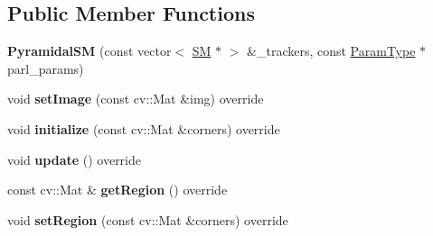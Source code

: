 \subsection*{Public Member Functions}
\begin{DoxyCompactItemize}
\item 
\hypertarget{classPyramidalSM_a79544cbce02e098dd3c0f32f65368e73}{{\bfseries Pyramidal\-S\-M} (const vector$<$ \hyperlink{classSearchMethod}{S\-M} $\ast$ $>$ \&\-\_\-trackers, const \hyperlink{structPyramidalParams}{Param\-Type} $\ast$parl\-\_\-params)}\label{classPyramidalSM_a79544cbce02e098dd3c0f32f65368e73}

\item 
\hypertarget{classPyramidalSM_a147b9e7a40fea4ef9baa561f4b162954}{void {\bfseries set\-Image} (const cv\-::\-Mat \&img) override}\label{classPyramidalSM_a147b9e7a40fea4ef9baa561f4b162954}

\item 
\hypertarget{classPyramidalSM_a604df9cbda381f47bb3f8d86149da183}{void {\bfseries initialize} (const cv\-::\-Mat \&corners) override}\label{classPyramidalSM_a604df9cbda381f47bb3f8d86149da183}

\item 
\hypertarget{classPyramidalSM_a516f3de838ef595b040bfd41a21c1851}{void {\bfseries update} () override}\label{classPyramidalSM_a516f3de838ef595b040bfd41a21c1851}

\item 
\hypertarget{classPyramidalSM_a00257f887ce477e604323f50124b0bff}{const cv\-::\-Mat \& {\bfseries get\-Region} () override}\label{classPyramidalSM_a00257f887ce477e604323f50124b0bff}

\item 
\hypertarget{classPyramidalSM_abf8e380b701a76c897c831968644bd76}{void {\bfseries set\-Region} (const cv\-::\-Mat \&corners) override}\label{classPyramidalSM_abf8e380b701a76c897c831968644bd76}

\end{DoxyCompactItemize}
